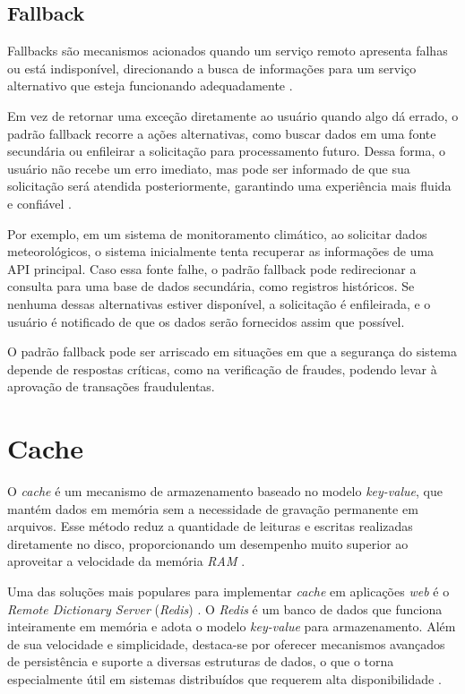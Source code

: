 \subsection{Fallback}
Fallbacks são mecanismos acionados quando um serviço remoto apresenta falhas ou está indisponível, direcionando a busca de informações para um serviço alternativo que esteja funcionando adequadamente \citep{Meiklejohn2024}.

Em vez de retornar uma exceção diretamente ao usuário quando algo dá errado, o padrão fallback recorre a ações alternativas, como buscar dados em uma fonte secundária ou enfileirar a solicitação para processamento futuro. Dessa forma, o usuário não recebe um erro imediato, mas pode ser informado de que sua solicitação será atendida posteriormente, garantindo uma experiência mais fluida e confiável \citep{huaylupo2021spring}.

Por exemplo, em um sistema de monitoramento climático, ao solicitar dados meteorológicos, o sistema inicialmente tenta recuperar as informações de uma API principal. Caso essa fonte falhe, o padrão fallback pode redirecionar a consulta para uma base de dados secundária, como registros históricos. Se nenhuma dessas alternativas estiver disponível, a solicitação é enfileirada, e o usuário é notificado de que os dados serão fornecidos assim que possível.

O padrão fallback pode ser arriscado em situações em que a segurança do sistema depende de respostas críticas, como na verificação de fraudes, podendo levar à aprovação de transações fraudulentas.

\section{Cache}

O \textit{cache} é um mecanismo de armazenamento baseado no modelo \textit{key-value}, que mantém dados em memória sem a necessidade de gravação permanente em arquivos. Esse método reduz a quantidade de leituras e escritas realizadas diretamente no disco, proporcionando um desempenho muito superior ao aproveitar a velocidade da memória \textit{RAM} \citep{falkevych2023}.

Uma das soluções mais populares para implementar \textit{cache} em aplicações \textit{web} é o \textit{Remote Dictionary Server} (\textit{Redis}) . O \textit{Redis} é um banco de dados que funciona inteiramente em memória e adota o modelo \textit{key-value} para armazenamento. Além de sua velocidade e simplicidade, destaca-se por oferecer mecanismos avançados de persistência e suporte a diversas estruturas de dados, o que o torna especialmente útil em sistemas distribuídos que requerem alta disponibilidade \citep{Kanthed2023}.


